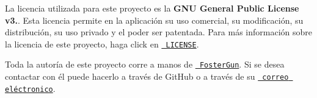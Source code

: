 \begin{DoxyCode}{0}
\DoxyCodeLine{}
\end{DoxyCode}


La licencia utilizada para este proyecto es la {\bfseries{G\+NU General Public License v3.}}. Esta licencia permite en la aplicación su uso comercial, su modificación, su distribución, su uso privado y el poder ser patentada. Para más información sobre la licencia de este proyecto, haga click en \href{https://github.com/FosterGun/GAICurricula/blob/FosterGun/LICENSE}{\texttt{ L\+I\+C\+E\+N\+SE}}.

Toda la autoría de este proyecto corre a manos de \href{https://github.com/FosterGun}{\texttt{ Foster\+Gun}}. Si se desea contactar con él puede hacerlo a través de Git\+Hub o a través de su \href{mailto:mblanco040@ikasle.ehu.es}{\texttt{ correo eléctronico}}. 